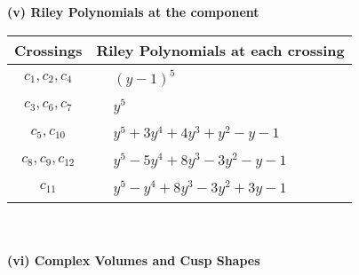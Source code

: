\documentclass[1p]{elsarticle_modified}
\theoremstyle{definition}
\begin{document}
\newpage\renewcommand{\arraystretch}{1}
\flushleft \textbf{(v) Riley Polynomials at the component}\newline \\
\begin{tabular}{m{50pt}|m{274pt}}
Crossings & \hspace{64pt}Riley Polynomials at each crossing \\
\hline $$\begin{aligned}c_{1},c_{2},c_{4}\end{aligned}$$&$\begin{aligned}
&(y-1)^5
\end{aligned}$\\
\hline $$\begin{aligned}c_{3},c_{6},c_{7}\end{aligned}$$&$\begin{aligned}
&y^5
\end{aligned}$\\
\hline $$\begin{aligned}c_{5},c_{10}\end{aligned}$$&$\begin{aligned}
&y^5+3 y^4+4 y^3+y^2- y-1
\end{aligned}$\\
\hline $$\begin{aligned}c_{8},c_{9},c_{12}\end{aligned}$$&$\begin{aligned}
&y^5-5 y^4+8 y^3-3 y^2- y-1
\end{aligned}$\\
\hline $$\begin{aligned}c_{11}\end{aligned}$$&$\begin{aligned}
&y^5- y^4+8 y^3-3 y^2+3 y-1
\end{aligned}$\\
\hline
\end{tabular}\\~\\
\newpage\flushleft \textbf{(vi) Complex Volumes and Cusp Shapes}
\end{document}
